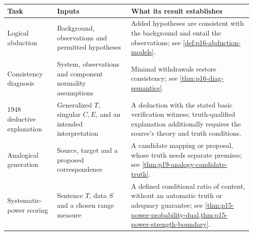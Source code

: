 \begin{center}
\small
\begin{tabular}{p{.18\linewidth}p{.28\linewidth}p{.42\linewidth}}
\textbf{Task}&\textbf{Inputs}&\textbf{What its result establishes}\\\hline
Logical abduction&
Background, observations and permitted hypotheses&
Added hypotheses are consistent with the background and
entail the observations; see \cref{def:p16-abduction-models}.\\[4pt]
Consistency diagnosis&
System, observations and component normality assumptions&
Minimal withdrawals restore consistency; see
\cref{thm:p16-diag-semantics}.\\[4pt]
1948 deductive explanation&
Generalized \(T\), singular \(C,E\), and an intended interpretation&
A deduction with the stated basic verification witness;
truth-qualified explanation additionally requires the
source's theory and truth conditions.\\[4pt]
Analogical generation&
Source, target and a proposed correspondence&
A candidate mapping or proposal, whose truth needs
separate premises; see \cref{thm:p19-analogy-candidate-truth}.\\[4pt]
Systematic-power scoring&
Sentence \(T\), data \(S\) and a chosen range measure&
A defined conditional ratio of content, without an
automatic truth or adequacy guarantee; see
\cref{thm:p15-power-probability-dual,thm:p15-power-strength-boundary}.
\end{tabular}
\end{center}
